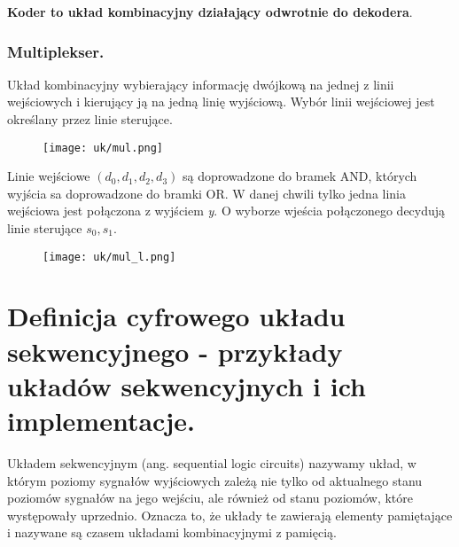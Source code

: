 \documentclass[main.tex]{subfiles}
\begin{document}
    \textbf{Koder to układ kombinacyjny działający odwrotnie do dekodera}.

    \subsubsection{Multiplekser.}
    Układ kombinacyjny wybierający informację dwójkową na jednej z linii wejściowych i kierujący ją na jedną linię
    wyjściową. Wybór linii wejściowej jest określany przez linie sterujące.

    \begin{figure}[H]
        \texttt{[image: uk/mul.png]}
    \end{figure}

    Linie wejściowe $(d_0, d_1, d_2, d_3)$ są doprowadzone do bramek AND, których wyjścia sa doprowadzone do bramki
    OR. W danej chwili tylko jedna linia wejściowa jest połączona z wyjściem \textit{y}. O wyborze wjeścia połączonego
    decydują linie sterujące $s_0, s_1$.

    \begin{figure}[H]
        \texttt{[image: uk/mul\_l.png]}
    \end{figure}

    \newpage

    \section{Definicja cyfrowego układu sekwencyjnego - przykłady układów sekwencyjnych i ich implementacje.}

    \begin{definition}
        Układem sekwencyjnym (ang. sequential logic circuits) nazywamy układ, w którym poziomy sygnałów wyjściowych zależą nie tylko od aktualnego stanu poziomów sygnałów na jego wejściu,
        ale również od stanu poziomów, które występowały uprzednio. Oznacza to, że układy te zawierają elementy pamiętające i nazywane są czasem układami kombinacyjnymi z pamięcią.
    \end{definition}
\end{document}
